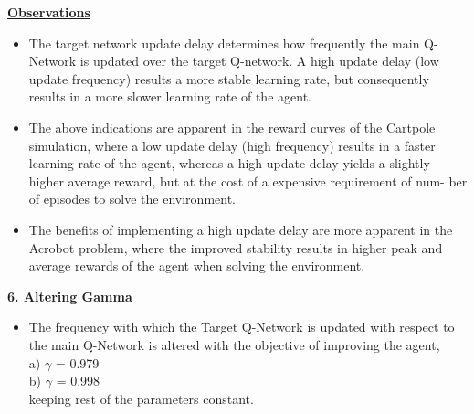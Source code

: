 \documentclass{article}
\begin{document}
\begin{itemize}
        \textbf{\underline{Observations}}
        \begin{itemize}
            \item The target network update delay determines how frequently the main Q-
            Network is updated over the target Q-network. A high update delay (low
            update frequency) results a more stable learning rate, but consequently
            results in a more slower learning rate of the agent.
            \item The above indications are apparent in the reward curves of the Cartpole
            simulation, where a low update delay (high frequency) results in a faster
            learning rate of the agent, whereas a high update delay yields a slightly
            higher average reward, but at the cost of a expensive requirement of num-
            ber of episodes to solve the environment.
            \item The benefits of implementing a high update delay are more apparent in
            the Acrobot problem, where the improved stability results in higher peak
            and average rewards of the agent when solving the environment.
        \end{itemize}
        \newpage
        \textbf{ 6. Altering Gamma} \\
        \begin{itemize}
            \item The frequency with which the Target Q-Network is updated with respect
            to the main Q-Network is altered with the objective of improving the agent,\\
            a) $\gamma$ = 0.979 \\
            b) $\gamma$ = 0.998 \\
            keeping rest of the parameters constant. \\
        \end{itemize}


\end{itemize}
\end{document}
